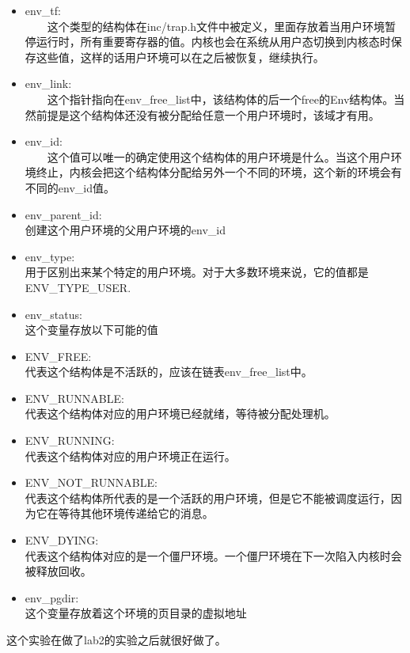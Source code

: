 \begin{ExerciseList}
\begin{itemize}
  \item env\_tf:\\
    　　这个类型的结构体在inc/trap.h文件中被定义，里面存放着当用户环境暂停运行时，所有重要寄存器的值。内核也会在系统从用户态切换到内核态时保存这些值，这样的话用户环境可以在之后被恢复，继续执行。
  \item env\_link:\\
    　　这个指针指向在env\_free\_list中，该结构体的后一个free的Env结构体。当然前提是这个结构体还没有被分配给任意一个用户环境时，该域才有用。
  \item env\_id:\\
    　　这个值可以唯一的确定使用这个结构体的用户环境是什么。当这个用户环境终止，内核会把这个结构体分配给另外一个不同的环境，这个新的环境会有不同的env\_id值。
  \item env\_parent\_id:\\
    创建这个用户环境的父用户环境的env\_id
  \item env\_type:\\
    用于区别出来某个特定的用户环境。对于大多数环境来说，它的值都是 ENV\_TYPE\_USER.
  \item env\_status:\\
    这个变量存放以下可能的值
  \item ENV\_FREE:\\
    代表这个结构体是不活跃的，应该在链表env\_free\_list中。
  \item ENV\_RUNNABLE: \\
    代表这个结构体对应的用户环境已经就绪，等待被分配处理机。
  \item ENV\_RUNNING:\\
    代表这个结构体对应的用户环境正在运行。
  \item ENV\_NOT\_RUNNABLE: \\
    代表这个结构体所代表的是一个活跃的用户环境，但是它不能被调度运行，因为它在等待其他环境传递给它的消息。
  \item ENV\_DYING: \\
    代表这个结构体对应的是一个僵尸环境。一个僵尸环境在下一次陷入内核时会被释放回收。
  \item env\_pgdir:\\
    这个变量存放着这个环境的页目录的虚拟地址
\end{itemize}


这个实验在做了lab2的实验之后就很好做了。


\end{ExerciseList}
